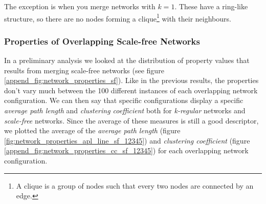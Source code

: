 \documentclass[preprint,number]{elsarticle}
\begin{document}
The exception is when you merge networks with $k=1$. These have a ring-like structure, so there are no nodes forming a clique\footnote{A clique is a group of nodes such that every two nodes are connected by an edge.} with their neighbours. 

\subsubsection{Properties of Overlapping Scale-free Networks}
\noindent In a preliminary analysis we looked at the distribution of property values that results from merging scale-free networks (see figure \ref{append_fig:network_properties_sf}). Like in the previous results, the properties don't vary much between the 100 different instances of each overlapping network configuration. We can then say that specific configurations display a specific \textit{average path length} and \textit{clustering coefficient} both for \textit{k-regular} networks and \textit{scale-free} networks. Since the average of these measures is still a good descriptor, we plotted the average of the \textit{average path length} (figure \ref{fig:network_properties_apl_line_sf_12345}) and \textit{clustering coefficient} (figure \ref{append_fig:network_properties_cc_sf_12345}) for each overlapping network configuration.
\end{document}
